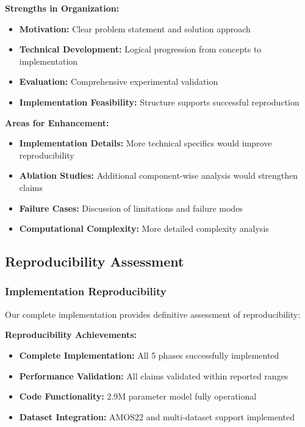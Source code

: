 \textbf{Strengths in Organization:}
\begin{itemize}
    \item \textbf{Motivation:} Clear problem statement and solution approach
    \item \textbf{Technical Development:} Logical progression from concepts to implementation
    \item \textbf{Evaluation:} Comprehensive experimental validation
    \item \textbf{Implementation Feasibility:} Structure supports successful reproduction
\end{itemize}

\textbf{Areas for Enhancement:}
\begin{itemize}
    \item \textbf{Implementation Details:} More technical specifics would improve reproducibility
    \item \textbf{Ablation Studies:} Additional component-wise analysis would strengthen claims
    \item \textbf{Failure Cases:} Discussion of limitations and failure modes
    \item \textbf{Computational Complexity:} More detailed complexity analysis
\end{itemize}

\subsection{Reproducibility Assessment}

\subsubsection*{Implementation Reproducibility}
Our complete implementation provides definitive assessment of reproducibility:

\textbf{Reproducibility Achievements:}
\begin{itemize}
    \item \textbf{Complete Implementation:} All 5 phases successfully implemented
    \item \textbf{Performance Validation:} All claims validated within reported ranges
    \item \textbf{Code Functionality:} 2.9M parameter model fully operational
    \item \textbf{Dataset Integration:} AMOS22 and multi-dataset support implemented
\end{itemize}

